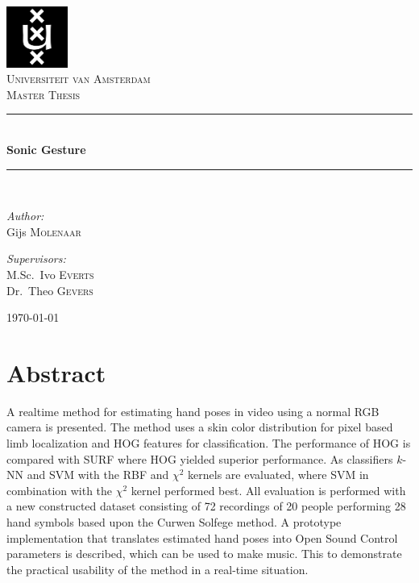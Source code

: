 \documentclass[a4paper, 11pt]{book}
\newcommand{\HRule}{\rule{\linewidth}{0.5mm}}
\begin{document}
\thispagestyle{empty}

\begin{titlepage}
\begin{center}

\includegraphics[width=0.15\textwidth]{./figures/uva.png}\\[1cm]
\textsc{\LARGE Universiteit van Amsterdam}\\[1.5cm]
\textsc{\Large Master Thesis}\\[0.5cm]

\HRule \\[0.4cm]
{ \huge \bfseries Sonic Gesture}\\[0.4cm]

\HRule \\[1.5cm]

\begin{minipage}{0.4\textwidth}
\begin{flushleft} \large
\emph{Author:}\\
Gijs \textsc{Molenaar}
\end{flushleft}
\end{minipage}
\begin{minipage}{0.4\textwidth}
\begin{flushright} \large
\emph{Supervisors:} \\
M.Sc.~Ivo \textsc{Everts} \\
Dr.~Theo \textsc{Gevers}
\end{flushright}
\end{minipage}

\vfill

{\large \today}

\end{center}
\end{titlepage}



\chapter*{Abstract}
A real\-time method for estimating hand poses in video using a normal RGB camera is presented. The method uses a skin color distribution for pixel based limb localization and HOG features for classification. The performance of HOG is compared with SURF where HOG yielded superior performance. As classifiers $k$-NN and SVM with the RBF and $\chi^2$ kernels are evaluated, where SVM in combination with the $\chi^2$ kernel performed best. All evaluation is performed with a new constructed dataset consisting of 72 recordings of 20 people performing 28 hand symbols based upon the Curwen Solfege method. A prototype implementation that translates estimated hand poses into Open Sound Control parameters is described, which can be used to make music. This to demonstrate the practical usability of the method in a real-time situation.
\end{document}
